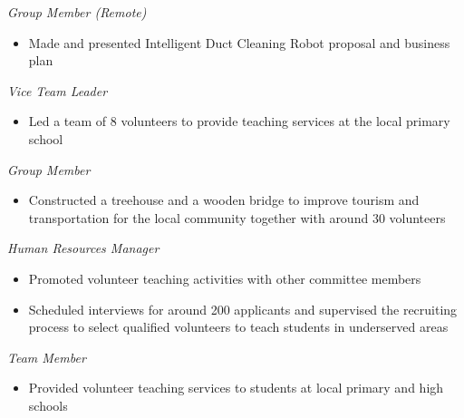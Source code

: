 \textit{Group Member (Remote)}\par
\begin{itemize}
  \item Made and presented Intelligent Duct Cleaning Robot proposal and business plan
\end{itemize}

\cventryspace
{}
\textit{Vice Team Leader}\par
\begin{itemize}
  \item Led a team of 8 volunteers to provide teaching services at the local primary school
\end{itemize}

\cventryspace
{}
\textit{Group Member}\par
\begin{itemize}
  \item Constructed a treehouse and a wooden bridge to improve tourism and transportation for the local community together with around 30 volunteers
\end{itemize}

\cventryspace
{}
\textit{Human Resources Manager}\par
\begin{itemize}
  \item Promoted volunteer teaching activities with other committee members
  \item Scheduled interviews for around 200 applicants and supervised the recruiting process to select qualified volunteers to teach students in underserved areas
\end{itemize}

\cventryspace
{}
\textit{Team Member}\par
\begin{itemize}
  \item Provided volunteer teaching services to students at local primary and high schools
\end{itemize}
